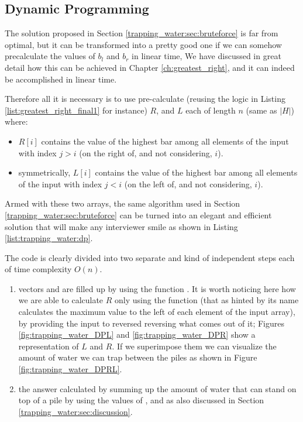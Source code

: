 \subsection{Dynamic Programming}
\label{trapping_water:sec:dp}
The solution proposed in Section \ref{trapping_water:sec:bruteforce} is far from optimal, but it can be transformed into a pretty good one if we can somehow precalculate the values of $b_l$ and $b_r$ in linear time,
We have discussed in great detail how this can be achieved in Chapter \ref{ch:greatest_right}, and it can indeed be accomplished in linear time. 

Therefore all it is necessary is to use pre-calculate (reusing the logic in Listing \ref{list:greatest_right_final1} for instance) $R$, and $L$ each of length $n$ (same as $|H|$) where: 
\begin{itemize}
	\item $R[i]$ contains the value of the highest bar among all elements of the input with index $j > i$ (on the right of, and not considering, $i$).
	\item symmetrically, $L[i]$ contains the value of the highest bar among all elements of the input with index $j < i$ (on the left of, and not considering, $i$).
\end{itemize}

Armed with these two arrays, the same algorithm used in Section \ref{trapping_water:sec:bruteforce} can be turned into an elegant and efficient solution that will make any interviewer smile as shown in 
Listing \ref{list:trapping_water:dp}.



The code is clearly divided into two separate and kind of independent steps each of time complexity $O(n)$. 
\begin{enumerate}
	\item vectors  and  are filled up by using the function . It is worth noticing here how we are able to calculate $R$ only using the function  (that as hinted by its name calculates the maximum value to the left of each element of the input array), by providing the input to  reversed reversing what comes out of it; Figures \ref{fig:trapping_water_DPL} and \ref{fig:trapping_water_DPR} show a representation of $L$ and $R$. If we superimpose them we can visualize the amount of water we can trap between the piles as shown in  Figure 
	\ref{fig:trapping_water_DPRL}.
	\item the answer calculated by summing up the amount of water that can stand on top of a pile by using the values of  ,  and  as also discussed in Section \ref{trapping_water:sec:discussion}.
\end{enumerate}

